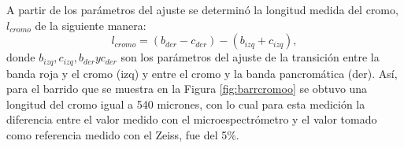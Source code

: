 \begin{figure}[H]
	\begin{floatrow}
	\end{floatrow}
\end{figure}

A partir de los parámetros del ajuste se determinó la longitud medida del cromo, $l_{cromo}$ de la siguiente manera:
\begin{equation}
l_{cromo} = (b_{der} - c_{der}) - (b_{izq} + c_{izq}),
\end{equation}
donde $b_{izq}, c_{izq}, b_{der} yc_{der}$ son los parámetros del ajuste de la transición entre la banda roja y el cromo (izq) y entre el cromo y la banda pancromática (der). Así, para el barrido que se muestra en la Figura \ref{fig:barrcromoo} se obtuvo una longitud del cromo igual a 540 micrones, con lo cual para esta medición la diferencia entre el valor medido con el microespectrómetro y el valor tomado como referencia medido con el Zeiss, fue del 5\%.

